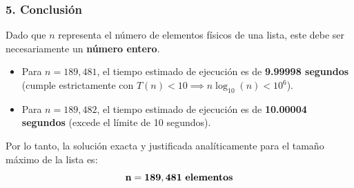 \begin{enumerate}
    
    \subsubsection*{5. Conclusión}
    Dado que $n$ representa el número de elementos físicos de una lista, este debe ser necesariamente un \textbf{número entero}. 
    
    \begin{itemize}[leftmargin=*]
        \item Para $n = 189,481$, el tiempo estimado de ejecución es de \textbf{9.99998 segundos} (cumple estrictamente con $T(n) < 10 \implies n \log_{10}(n) < 10^6$).


        \item Para $n = 189,482$, el tiempo estimado de ejecución es de \textbf{10.00004 segundos} (excede el límite de 10 segundos).

        
    \end{itemize}
    
    Por lo tanto, la solución exacta y justificada analíticamente para el tamaño máximo de la lista es:
    $$\mathbf{n = 189,481 \text{ \textbf{elementos}}}$$

\end{enumerate}

